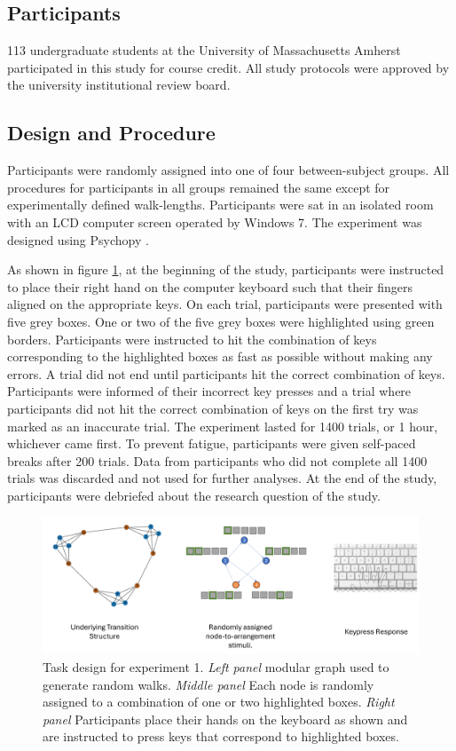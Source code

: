 \subsection*{Participants}
113 undergraduate students at the University of Massachusetts Amherst participated in this study for course credit. All study protocols were approved by the university institutional review board. 

\subsection*{Design and Procedure}
Participants were randomly assigned into one of four between-subject groups. All procedures for participants in all groups remained the same except for experimentally defined walk-lengths. Participants were sat in an isolated room with an LCD computer screen operated by Windows 7. The experiment was designed using Psychopy \cite{peirce2007psychopy}. 

As shown in figure \ref{fig:exp1-design}, at the beginning of the study, participants were instructed to place their right hand on the computer keyboard such that their fingers aligned on the appropriate keys. On each trial, participants were presented with five grey boxes. One or two of the five grey boxes were highlighted using green borders. Participants were instructed to hit the combination of keys corresponding to the highlighted boxes as fast as possible without making any errors. A trial did not end until participants hit the correct combination of keys. Participants were informed of their incorrect key presses and a trial where participants did not hit the correct combination of keys on the first try was marked as an inaccurate trial. The experiment lasted for 1400 trials, or 1 hour, whichever came first. To prevent fatigue, participants were given self-paced breaks after 200 trials. Data from participants who did not complete all 1400 trials was discarded and not used for further analyses. At the end of the study, participants were debriefed about the research question of the study.

\begin{figure}
	\centering
	\label{fig:exp1-design}
	\includegraphics[width = \textwidth]{chapter_notebooks/chapter_2/figures/exp1_task_design.png}
	\caption{Task design for experiment 1. \textit{Left panel} modular graph used to generate random walks. \textit{Middle panel} Each node is randomly assigned to a combination of one or two highlighted boxes. \textit{Right panel} Participants place their hands on the keyboard as shown and are instructed to press keys that correspond to highlighted boxes.}
\end{figure}

